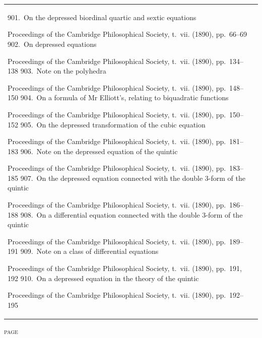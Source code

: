 \documentclass[11pt,a4paper]{book}
\providecommand{\paperentry}[3]{#1.\ #2\dotfill #3\par}
\begin{document}
\begin{center}
\begin{tabular}{p{4.2in}r}
\paperentry{901}{On the depressed biordinal quartic and sextic equations}{54}{Proceedings of the Cambridge Philosophical Society, t.~vii. (1890), pp.~66--69}
\paperentry{902}{On depressed equations}{57}{Proceedings of the Cambridge Philosophical Society, t.~vii. (1890), pp.~134--138}
\paperentry{903}{Note on the polyhedra}{62}{Proceedings of the Cambridge Philosophical Society, t.~vii. (1890), pp.~148--150}
\paperentry{904}{On a formula of Mr Elliott's, relating to biquadratic functions}{65}{Proceedings of the Cambridge Philosophical Society, t.~vii. (1890), pp.~150--152}
\paperentry{905}{On the depressed transformation of the cubic equation}{68}{Proceedings of the Cambridge Philosophical Society, t.~vii. (1890), pp.~181--183}
\paperentry{906}{Note on the depressed equation of the quintic}{71}{Proceedings of the Cambridge Philosophical Society, t.~vii. (1890), pp.~183--185}
\paperentry{907}{On the depressed equation connected with the double 3-form of the quintic}{73}{Proceedings of the Cambridge Philosophical Society, t.~vii. (1890), pp.~186--188}
\paperentry{908}{On a differential equation connected with the double 3-form of the quintic}{76}{Proceedings of the Cambridge Philosophical Society, t.~vii. (1890), pp.~189--191}
\paperentry{909}{Note on a class of differential equations}{79}{Proceedings of the Cambridge Philosophical Society, t.~vii. (1890), pp.~191, 192}
\paperentry{910}{On a depressed equation in the theory of the quintic}{80}{Proceedings of the Cambridge Philosophical Society, t.~vii. (1890), pp.~192--195}
\end{tabular}
\end{center}

\newpage
\thispagestyle{fancy}
\begin{center}
{\small\textsc{page}}
\end{center}
\vspace{-0.5em}
\end{document}
